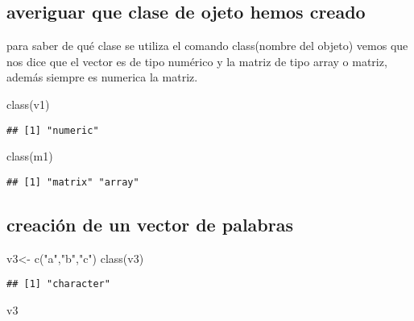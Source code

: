 \documentclass[]{elsarticle} %
\newenvironment{Shaded}{\begin{snugshade}}{\end{snugshade}}
\newcommand{\FunctionTok}[1]{\textcolor[rgb]{0.00,0.00,0.00}{#1}}
\newcommand{\NormalTok}[1]{#1}
\newcommand{\OtherTok}[1]{\textcolor[rgb]{0.56,0.35,0.01}{#1}}
\newcommand{\StringTok}[1]{\textcolor[rgb]{0.31,0.60,0.02}{#1}}
\begin{document}
\hypertarget{averiguar-que-clase-de-ojeto-hemos-creado}{%
\subsection{averiguar que clase de ojeto hemos
creado}\label{averiguar-que-clase-de-ojeto-hemos-creado}}

para saber de qué clase se utiliza el comando class(nombre del objeto)
vemos que nos dice que el vector es de tipo numérico y la matriz de tipo
array o matriz, además siempre es numerica la matriz.

\begin{Shaded}
\begin{Highlighting}[]
\FunctionTok{class}\NormalTok{(v1)}
\end{Highlighting}
\end{Shaded}

\begin{verbatim}
## [1] "numeric"
\end{verbatim}

\begin{Shaded}
\begin{Highlighting}[]
\FunctionTok{class}\NormalTok{(m1)}
\end{Highlighting}
\end{Shaded}

\begin{verbatim}
## [1] "matrix" "array"
\end{verbatim}

\hypertarget{creaciuxf3n-de-un-vector-de-palabras}{%
\subsection{creación de un vector de
palabras}\label{creaciuxf3n-de-un-vector-de-palabras}}

\begin{Shaded}
\begin{Highlighting}[]
\NormalTok{v3}\OtherTok{\textless{}{-}} \FunctionTok{c}\NormalTok{(}\StringTok{"a"}\NormalTok{,}\StringTok{"b"}\NormalTok{,}\StringTok{"c"}\NormalTok{)}
\FunctionTok{class}\NormalTok{(v3)}
\end{Highlighting}
\end{Shaded}

\begin{verbatim}
## [1] "character"
\end{verbatim}

\begin{Shaded}
\begin{Highlighting}[]
\NormalTok{v3}
\end{Highlighting}
\end{Shaded}
\end{document}
